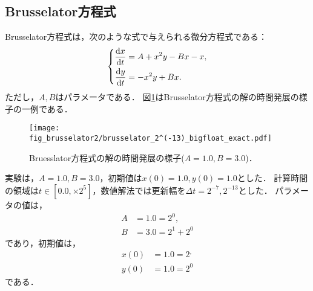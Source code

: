 \subsection{Brusselator方程式}
Brusselator方程式は，次のような式で与えられる微分方程式である：
\begin{align*}
    \left\{
    \begin{aligned}
        \frac{\mathrm{d}x}{\mathrm{d}t} &= A + x^2y - Bx - x,\\
        \frac{\mathrm{d}y}{\mathrm{d}t} &= -x^2y + Bx.
    \end{aligned}
        \right.
\end{align*}
ただし，$A,B$はパラメータである．
図\ref{fig:brusselator}はBrusselator方程式の解の時間発展の様子の一例である．
\begin{figure}[H]
    \centering
    \begin{minipage}[b]{0.9\columnwidth}
            \texttt{[image: fig\_brusselator2/brusselator\_2^(-13)\_bigfloat\_exact.pdf]}
    \end{minipage}
    \caption{Bruesslator方程式の解の時間発展の様子($A=1.0, B=3.0$)．}
    \label{fig:brusselator}
\end{figure}
実験は，$A=1.0, B=3.0$，初期値は$x(0) = 1.0, y(0) = 1.0$とした．
計算時間の領域は$t \in [0.0, \times 2^5]$，数値解法では更新幅を$\Delta t =  2^{-7}, 2^{-13}$とした．
パラメータの値は，
\begin{align*}
    A &= 1.0 = 2^0, \\
    B &= 3.0 = 2^1 + 2^0
\end{align*}
であり，初期値は，
\begin{align*}
    x(0) &= 1.0 = 2^, \\
    y(0) &= 1.0 = 2^0
\end{align*} 
である．
